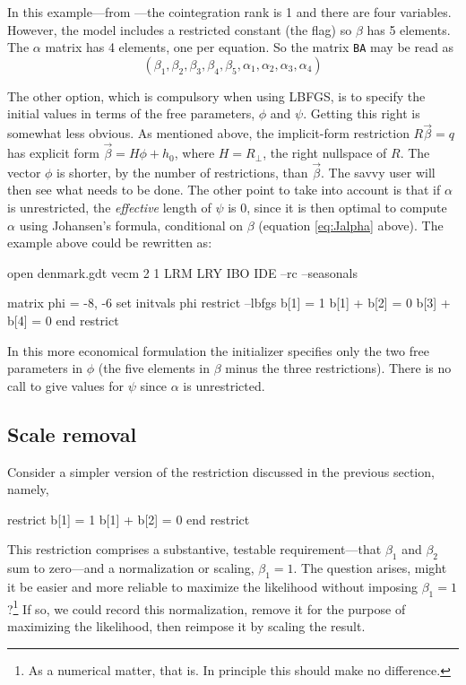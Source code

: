 In this example---from \cite[pp.\ 114--115]{johansen95}---the
cointegration rank is 1 and there are four variables.  However, the
model includes a restricted constant (the  flag) so $\beta$
has 5 elements.  The $\alpha$ matrix has 4 elements, one per equation.
So the matrix \texttt{BA} may be read as
\[
\left(\beta_1, \beta_2, \beta_3, \beta_4, \beta_5,
 \alpha_1, \alpha_2, \alpha_3, \alpha_4 \right)
\]

The other option, which is compulsory when using LBFGS, is to specify
the initial values in terms of the free parameters, $\phi$ and $\psi$.
Getting this right is somewhat less obvious.  As mentioned above, the
implicit-form restriction $R\vec{\beta} = q$ has explicit form
$\vec{\beta} = H\phi + h_0$, where $H = R_{\perp}$, the right
nullspace of $R$.  The vector $\phi$ is shorter, by the number of
restrictions, than $\vec{\beta}$.  The savvy user will then see what
needs to be done.  The other point to take into account is that if
$\alpha$ is unrestricted, the \textit{effective} length of $\psi$ is
0, since it is then optimal to compute $\alpha$ using Johansen's
formula, conditional on $\beta$ (equation \ref{eq:Jalpha} above).  The
example above could be rewritten as:
\begin{code}
open denmark.gdt
vecm 2 1 LRM LRY IBO IDE --rc --seasonals

matrix phi = {-8, -6}
set initvals phi
restrict --lbfgs
  b[1] = 1
  b[1] + b[2] = 0
  b[3] + b[4] = 0
end restrict
\end{code}

In this more economical formulation the initializer specifies only the
two free parameters in $\phi$ (the five elements in $\beta$ minus the
three restrictions).  There is no call to give values for $\psi$ since
$\alpha$ is unrestricted.

\subsection{Scale removal}
\label{sec:vecm-scale-removal}

Consider a simpler version of the restriction discussed in the
previous section, namely,
%
\begin{code}
restrict
  b[1] = 1
  b[1] + b[2] = 0
end restrict
\end{code}

This restriction comprises a substantive, testable requirement---that
$\beta_1$ and $\beta_2$ sum to zero---and a normalization or scaling,
$\beta_1 = 1$.  The question arises, might it be easier and more
reliable to maximize the likelihood without imposing $\beta_1 =
1$?\footnote{As a numerical matter, that is.  In principle this should
  make no difference.}  If so, we could record this normalization,
remove it for the purpose of maximizing the likelihood, then reimpose
it by scaling the result.

